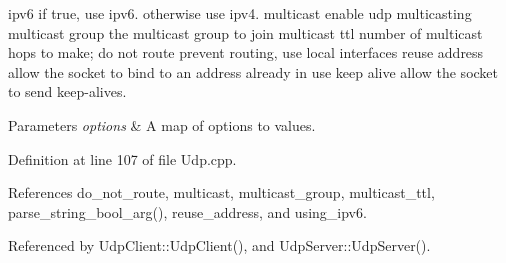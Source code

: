 ipv6 if true, use ipv6. otherwise use ipv4. multicast enable udp multicasting multicast group the multicast group to join multicast ttl number of multicast hops to make; do not route prevent routing, use local interfaces reuse address allow the socket to bind to an address already in use keep alive allow the socket to send keep-\/alives.


\begin{DoxyParams}{Parameters}
{\em options} & A map of options to values. \\
\hline
\end{DoxyParams}


Definition at line 107 of file Udp.cpp.



References do\_\-not\_\-route, multicast, multicast\_\-group, multicast\_\-ttl, parse\_\-string\_\-bool\_\-arg(), reuse\_\-address, and using\_\-ipv6.



Referenced by UdpClient::UdpClient(), and UdpServer::UdpServer().


